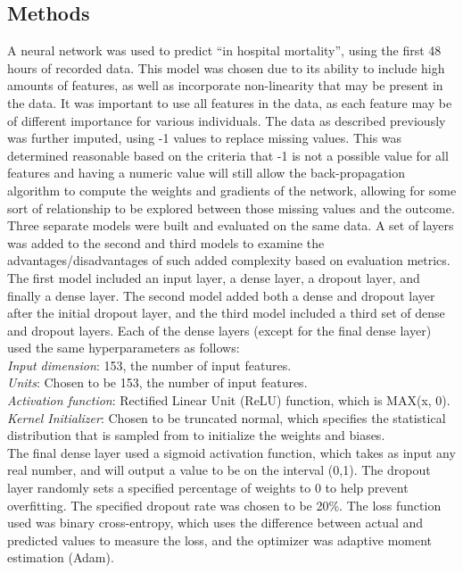 \documentclass{article}
\begin{document}
\begin{multicols}{2}
\section{Methods}
A neural network was used to predict “in hospital mortality”, using the first 48 hours of recorded data. This model was chosen due to its ability to include high amounts of features, as well as incorporate non-linearity that may be present in the data. It was important to use all features in the data, as each feature may be of different importance for various individuals. The data as described previously was further imputed, using -1 values to replace missing values. This was determined reasonable based on the criteria that -1 is not a possible value for all features and having a numeric value will still allow the back-propagation algorithm to compute the weights and gradients of the network, allowing for some sort of relationship to be explored between those missing values and the outcome.
Three separate models were built and evaluated on the same data. A set of layers was added to the second and third models to examine the advantages/disadvantages of such added complexity based on evaluation metrics. The first model included an input layer, a dense layer, a dropout layer, and finally a dense layer. The second model added both a dense and dropout layer after the initial dropout layer, and the third model included a third set of dense and dropout layers. Each of the dense layers (except for the final dense layer) used the same hyperparameters as follows:
\\
\emph{Input dimension}: 153, the number of input features.
\\
\emph{Units}: Chosen to be 153, the number of input features.
\\
\emph{Activation function}: Rectified Linear Unit (ReLU) function, which is MAX(x, 0).
\\
\emph{Kernel Initializer}: Chosen to be truncated normal, which specifies the statistical distribution that is sampled from to initialize the weights and biases.
\\
The final dense layer used a sigmoid activation function, which takes as input any real number, and will output a value to be on the interval (0,1). The dropout layer randomly sets a specified percentage of weights to 0 to help prevent overfitting. The specified dropout rate was chosen to be 20\%.
The loss function used was binary cross-entropy, which uses the difference between actual and predicted values to measure the loss, and the optimizer was adaptive moment estimation (Adam).

\end{multicols}
\end{document}
